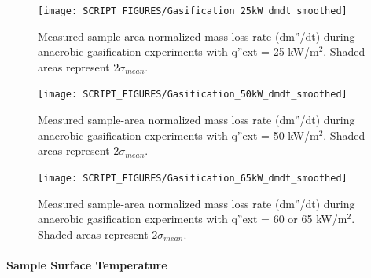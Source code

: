 \documentclass{book}
\begin{document}
\begin{figure}
  \centering
  \texttt{[image: SCRIPT\_FIGURES/Gasification\_25kW\_dmdt\_smoothed]}
  \caption{Measured sample-area normalized mass loss rate (dm”/dt) during anaerobic gasification experiments with q”ext = 25 kW/m$^2$. Shaded areas represent $2\sigma_{mean}$.}
  \label{Fig:Gasification_25kW_dmdt}
\end{figure}

\begin{figure}
  \centering
  \texttt{[image: SCRIPT\_FIGURES/Gasification\_50kW\_dmdt\_smoothed]}
  \caption{Measured sample-area normalized mass loss rate (dm”/dt) during anaerobic gasification experiments with q”ext = 50 kW/m$^2$. Shaded areas represent $2\sigma_{mean}$.}
  \label{Fig:Gasification_50kW_dmdt}
\end{figure}

\begin{figure}
  \centering
  \texttt{[image: SCRIPT\_FIGURES/Gasification\_65kW\_dmdt\_smoothed]}
  \caption{Measured sample-area normalized mass loss rate (dm”/dt) during anaerobic gasification experiments with q”ext = 60 or 65 kW/m$^2$. Shaded areas represent $2\sigma_{mean}$.}
  \label{Fig:Gasification_65kW_dmdt}
\end{figure}


\paragraph{Sample Surface Temperature}
\end{document}
